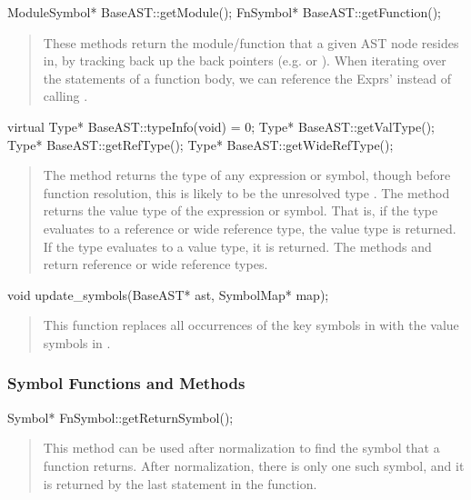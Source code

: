 \documentclass[10pt]{article}
\begin{document}
\begin{clang}
ModuleSymbol* BaseAST::getModule();
FnSymbol* BaseAST::getFunction();
\end{clang}
\begin{quote}
These methods return the module/function that a given AST node resides
in, by tracking back up the back pointers (e.g.  or
).  When iterating over the statements of
a function body, we can reference the Exprs' 
instead of calling .
\end{quote}

\begin{clang}
virtual Type* BaseAST::typeInfo(void) = 0;
Type* BaseAST::getValType();
Type* BaseAST::getRefType();
Type* BaseAST::getWideRefType();
\end{clang}
\begin{quote}
The method  returns the type of any expression or symbol,
  though before function resolution, this is likely to be the
  unresolved type .  The method  returns
  the value type of the expression or symbol.  That is, if the type
  evaluates to a reference or wide reference type, the value type is
  returned.  If the type evaluates to a value type, it is returned.
  The methods  and  return reference
  or wide reference types.
\end{quote}

\begin{clang}
void update_symbols(BaseAST* ast, SymbolMap* map);
\end{clang}
\begin{quote}
This function replaces all occurrences of the key symbols in 
with the value symbols in .
\end{quote}

\subsubsection{Symbol Functions and Methods}

\begin{clang}
Symbol* FnSymbol::getReturnSymbol();
\end{clang}
\begin{quote}
This method can be used after normalization to find the symbol that a
function returns.  After normalization, there is only one such symbol,
and it is returned by the last statement in the function.
\end{quote}
\end{document}
